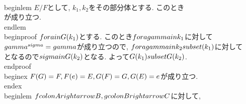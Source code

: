 {\\begin{lem}
 $E/F$として, $k_{1}, k_{2}$をその部分体とする. このとき
 \\[
  k_{1}\\supset k_{2}\\Leftrightarrow \\G(k_{1})\\subset \\G(k_{2})
 \\]
 が成り立つ.
\\end{lem}
\\begin{proof}
 $\\fora \\in \\G(k_{1})$とする. このとき$\\fora \\gamma\\in k_{1}$に対して
 $\\gamma^{\\sigma}=\\gamma$が成り立つので, $\\fora \\gamma\\in
 k_{2}\\subset(k_{1})$に対して
 \\[
  \\gamma^{\\tau}=\\gamma
 \\]
 となるので$\\sigma\\in \\G(k_{2})$となる. よって$\\G(k_{1})\\subset
 \\G(k_{2})$.
\\end{proof}
 \\begin{ex}
  $\\F(G)=F, \\F(\\{e\\})=E, \\G(F)=G, \\G(E)=\\{e\\}$が成り立つ.
 \\end{ex}
 \\begin{lem}
  $f\\colon A\\rightarrow B, g\\colon B\\rightarrow C$に対して,
}
